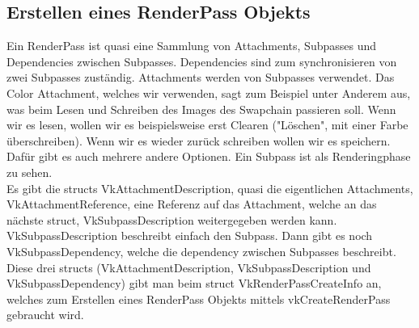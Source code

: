 \documentclass[11pt,a4paper]{report}
\begin{document}
\subsection{Erstellen eines RenderPass Objekts}
Ein RenderPass ist quasi eine Sammlung von Attachments, Subpasses und Dependencies zwischen Subpasses. Dependencies sind zum synchronisieren von zwei Subpasses zuständig. Attachments werden von Subpasses verwendet. Das Color Attachment, welches wir verwenden, sagt zum Beispiel unter Anderem aus, was beim Lesen und Schreiben des Images des Swapchain passieren soll. Wenn wir es lesen, wollen wir es beispielsweise erst Clearen ("Löschen", mit einer Farbe überschreiben). Wenn wir es wieder zurück schreiben wollen wir es speichern. Dafür gibt es auch mehrere andere Optionen. Ein Subpass ist als Renderingphase zu sehen.\\Es gibt die structs VkAttachmentDescription, quasi die eigentlichen Attachments, VkAttachmentReference, eine Referenz auf das Attachment, welche an das nächste struct, VkSubpassDescription weitergegeben werden kann. VkSubpassDescription beschreibt einfach den Subpass. Dann gibt es noch VkSubpassDependency, welche die dependency zwischen Subpasses beschreibt. Diese drei structs (VkAttachmentDescription, VkSubpassDescription und VkSubpassDependency) gibt man beim struct VkRenderPassCreateInfo an, welches zum Erstellen eines RenderPass Objekts mittels vkCreateRenderPass gebraucht wird.
\end{document}
